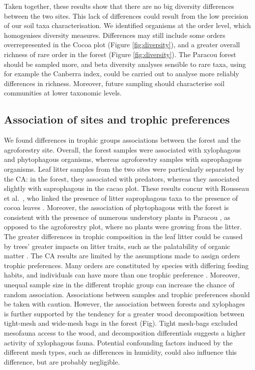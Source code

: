 \documentclass[fleqn,10pt]{ArtEcoFoG} %
\begin{document}
Taken together, these results show that there are no big diversity differences between the two sites. This lack of differences could result from the low precision of our soil taxa characterisation. We identified organisms at the order level, which homogenises diversity measures. Differences may still include some orders overrepresented in the Cocoa plot (Figure \ref{fig:diversity}), and a greater overall richness of rare order in the forest (Figure \ref{fig:diversity}). The Paracou forest should be sampled more, and beta diversity analyses sensible to rare taxa, using for example the Canberra index, could be carried out to analyse more reliably differences in richness. Moreover, future sampling should characterise soil communities at lower taxonomic levels.

\subsection{Association of sites and trophic preferences}\label{association-of-sites-and-trophic-preferences}

We found differences in trophic groups associations between the forest and the agroforestry site. Overall, the forest samples were associated with xylophagous and phytophagous organisms, whereas agroforestry samples with saprophagous organisms. Leaf litter samples from the two sites were particularly separated by the CA: in the forest, they associated with predators, whereas they associated slightly with saprophagous in the cacao plot. These results concur with Rousseau et al.~, who linked the presence of litter saprophagous taxa to the presence of cocoa leaves \citep{rousseau_shade_2021}. Moreover, the association of phytophagous with the forest is consistent with the presence of numerous understory plants in Paracou \citep{rousseau_macrofauna_2014}, as opposed to the agroforestry plot, where no plants were growing from the litter. The greater differences in trophic composition in the leaf litter could be caused by trees' greater impacts on litter traits, such as the palatability of organic matter \citep{korboulewsky_how_2016, rousseau_shade_2021, moco_relationships_2010}. The CA results are limited by the assumptions made to assign orders trophic preferences. Many orders are constituted by species with differing feeding habits, and individuals can have more than one trophic preference \citep{potapov_feeding_2022}. Moreover, unequal sample size in the different trophic group can increase the chance of random association. Associations between samples and trophic preferences should be taken with caution. However, the association between forests and xylophages is further supported by the tendency for a greater wood decomposition between tight-mesh and wide-mesh bags in the forest (Fig). Tight mesh-bags excluded mesofauna access to the wood, and decomposition differentials suggests a higher activity of xylophagous fauna. Potential confounding factors induced by the different mesh types, such as differences in humidity, could also influence this difference, but are probably negligible.
\end{document}
